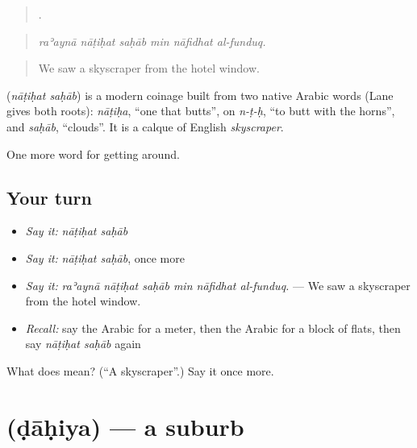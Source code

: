 \begin{quote}
     .
\end{quote}

\begin{quote}
\emph{raʾaynā nāṭiḥat saḥāb min nāfidhat al-funduq.}
\end{quote}

\begin{quote}
We saw a skyscraper from the hotel window.
\end{quote}

\begin{cousinweb}
\textbf{ } (\emph{nāṭiḥat saḥāb}) is a modern coinage built from two native Arabic words (Lane gives both roots): \emph{nāṭiḥa}, \textquotedblleft{}one that butts\textquotedblright{}, on \emph{n-ṭ-ḥ}, \textquotedblleft{}to butt with the horns\textquotedblright{}, and \emph{saḥāb}, \textquotedblleft{}clouds\textquotedblright{}. It is a calque of English \emph{skyscraper}.
\end{cousinweb}

\begin{grammarlens}[title={What you've built}]
One more word for getting around.
\end{grammarlens}

\subsection*{Your turn}
\begin{itemize}
\raggedright
  \item \emph{Say it:} \emph{nāṭiḥat saḥāb}
  \item \emph{Say it:} \emph{nāṭiḥat saḥāb}, once more
  \item \emph{Say it:} \emph{raʾaynā nāṭiḥat saḥāb min nāfidhat al-funduq.} — We saw a skyscraper from the hotel window.
  \item \emph{Recall:} say the Arabic for a meter, then the Arabic for a block of flats, then say \emph{nāṭiḥat saḥāb} again
\end{itemize}

\begin{tcolorbox}[breakable,colback=teal!4,colframe=teal!35!black,title={Before you move on}]
What does   mean? (\textquotedblleft{}A skyscraper\textquotedblright{}.) Say it once more.
\end{tcolorbox}
\section[\texorpdfstring{\ar{ضاحية} (ḍāḥiya)}{ضاحية (ḍāḥiya)}]{ (ḍāḥiya) — a suburb}

